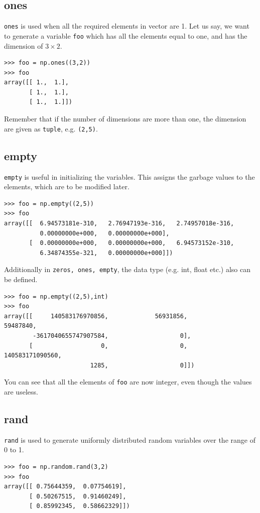 \documentclass[10pt]{book}
\begin{document}
{\subsection{ones}
\verb"ones" is used when all the required elements in vector are 1. Let us say, we want to generate a variable \verb"foo" which has all the elements equal to one, and has the dimension of $3 \times 2$. 

\beforeverb
\begin{verbatim}
>>> foo = np.ones((3,2))
>>> foo
array([[ 1.,  1.],
       [ 1.,  1.],
       [ 1.,  1.]])
\end{verbatim}
\afterverb
Remember that if the number of dimensions are more than one, the dimension are given as \verb"tuple", e.g. \verb"(2,5)". 

\subsection{empty}
\verb"empty" is useful in initializing the variables. This assigns the garbage values to the elements, which are to be modified later. 
\beforeverb \begin{verbatim}
>>> foo = np.empty((2,5))
>>> foo
array([[  6.94573181e-310,   2.76947193e-316,   2.74957018e-316,
          0.00000000e+000,   0.00000000e+000],
       [  0.00000000e+000,   0.00000000e+000,   6.94573152e-310,
          6.34874355e-321,   0.00000000e+000]])
\end{verbatim}
\afterverb

Additionally in \verb"zeros, ones, empty", the data type (e.g. int, float etc.) also can be defined.
\beforeverb \begin{verbatim}
>>> foo = np.empty((2,5),int)
>>> foo
array([[     140583176970856,             56931856,             59487840,
        -3617040655747907584,                    0],
       [                   0,                    0,      140583171090560,
                        1285,                    0]])
\end{verbatim} \afterverb
You can see that all the elements of \verb"foo" are now integer, even though the values are useless. 

\subsection{rand}
\verb"rand" is used to generate uniformly distributed random variables over the range of 0 to 1.

\beforeverb \begin{verbatim}
>>> foo = np.random.rand(3,2)
>>> foo
array([[ 0.75644359,  0.07754619],
       [ 0.50267515,  0.91460249],
       [ 0.85992345,  0.58662329]])
\end{verbatim} \afterverb

}
\end{document}
